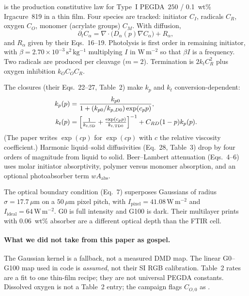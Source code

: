 \citet{Montgomery2022} is the production constitutive law for Type~I PEGDA~$250$ / 0.1~wt\% Irgacure~819 in a thin film.
Four species are tracked: initiator $C_I$, radicals $C_R$, oxygen $C_O$, monomer (acrylate groups) $C_M$.
With diffusion,
\begin{equation}
  \partial_t C_\alpha = \nabla\cdot\bigl(D_\alpha(p)\nabla C_\alpha\bigr) + R_\alpha,
\end{equation}
and $R_\alpha$ given by their Eqs.~16--19.
Photolysis is first order in remaining initiator, with $\beta=2.70\times10^{-3}\,\mathrm{s^2\,kg^{-1}}$ multiplying $I$ in $\mathrm{W\,m^{-2}}$ so that $\beta I$ is a frequency.
Two radicals are produced per cleavage ($m=2$).
Termination is $2k_t C_R^2$ plus oxygen inhibition $k_O C_O C_R$.

The closures (their Eqs.~22--27, Table~2) make $k_p$ and $k_t$ conversion-dependent:
\begin{align}
  k_p(p) &= \frac{k_{p0}}{1+(k_{p0}/k_{p,D0})\exp(c_p p)}, \\
  k_t(p) &= \Bigl[\tfrac{1}{k_{t,\mathrm{SD}}}+\tfrac{\exp(c_p p)}{k_{t,\mathrm{TD0}}}\Bigr]^{-1}
           + C_{RD}(1-p)k_p(p).
\end{align}
(The paper writes $\exp(cp)$ for $\exp(c p)$ with $c$ the relative viscosity coefficient.)
Harmonic liquid--solid diffusivities (Eq.~28, Table~3) drop by four orders of magnitude from liquid to solid.
Beer--Lambert attenuation (Eqs.~4--6) uses molar initiator absorptivity, polymer versus monomer absorption, and an optional photoabsorber term $w A_{\mathrm{abs}}$.

The optical boundary condition (Eq.~7) superposes Gaussians of radius $\sigma=17.7\,\mu\mathrm{m}$ on a $50\,\mu\mathrm{m}$ pixel pitch, with $I_{\mathrm{pixel}}=41.08\,\mathrm{W\,m^{-2}}$ and $I_{\mathrm{ideal}}=64\,\mathrm{W\,m^{-2}}$.
G0 is full intensity and G100 is dark.
Their multilayer prints with 0.06~wt\% absorber are a different optical depth than the FTIR cell.

\paragraph{What we did not take from this paper as gospel.}
The Gaussian kernel is a fallback, not a measured DMD map.
The linear G0--G100 map used in code is \emph{assumed}, not their SI RGB calibration.
Table~2 rates are a fit to one thin-film recipe; they are not universal PEGDA constants.
Dissolved oxygen is not a Table~2 entry; the campaign flags $C_{O,0}$ as \stillreq.

